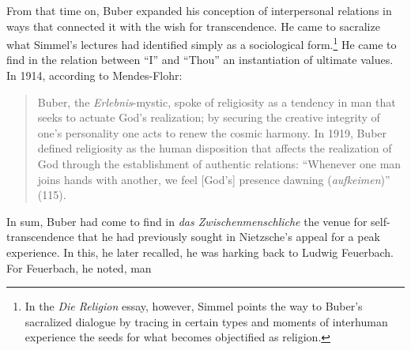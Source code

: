 From that time on, Buber expanded his conception of interpersonal relations in ways that connected it with the wish for transcendence. He came to sacralize what Simmel's lectures had identified simply as a sociological form.\footnote{In the \emph{Die Religion} essay, however, Simmel points the way to Buber's sacralized dialogue by tracing in certain types and moments of interhuman experience the seeds for what becomes objectified as religion.} He came to find in the relation between ``I'' and ``Thou'' an instantiation of ultimate values. In 1914, according to Mendes-Flohr: 

\begin{quote}
Buber, the \emph{Erlebnis}-mystic, spoke of religiosity as a tendency in man that seeks to actuate God's realization; by securing the creative integrity of one's personality one acts to renew the cosmic harmony. In 1919, Buber defined religiosity as the human disposition that affects the realization of God through the establishment of authentic relations: ``Whenever one man joins hands with another, we feel [God's] presence dawning (\emph{aufkeimen})'' (115).
\end{quote}

In sum, Buber had come to find in \emph{das Zwischenmenschliche} the venue for self-transcendence that he had previously sought in Nietzsche's appeal for a peak experience. In this, he later recalled, he was harking back to Ludwig Feuerbach. For Feuerbach, he noted, man

